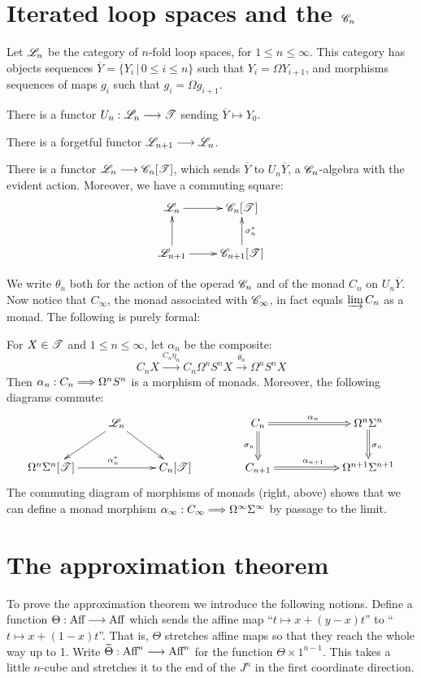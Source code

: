 \documentclass[11pt]{article}
\newcommand{\Aff}{\textup{Aff}}
\begin{document}
\begin{chapter4-6}
\section{Iterated loop spaces and the \texorpdfstring{$\mathscr{C}_n$}{Cn}}
Let $\mathscr{L}_n$ be the category of $n$-fold loop spaces, for $1\leq n\leq\infty$. This category has objects sequences $\overline{Y}=\{Y_i\,|\,0\leq i\leq n\}$ such that $Y_i=\Omega Y_{i+1}$, and morphisms sequences of maps $g_i$ such that $g_i=\Omega g_{i+1}$.
\begin{itemise}
\item There is a functor $U_n:\mathscr{L}_n\longrightarrow\mathscr{T}$ sending $\overline{Y}\mapsto Y_0$.
\item  There is a forgetful functor $\mathscr{L}_{n+1}\longrightarrow\mathscr{L}_{n}$.
\end{itemise}
\begin{thm*}[5.1]
There is a functor $\mathscr{L}_n\longrightarrow\mathscr{C}_n[\mathscr{T}]$, which sends $\overline{Y}$ to $U_n\overline{Y}$, a $\mathscr{C}_n$-algebra with the evident action. Moreover, we have a commuting square:
\[\xymatrix{
\scrL_n\ar[r]\ar[d];[]&\scrC_n[\scrT]\ar[d];[]_{\sigma_n^*}\\
\scrL_{n+1}\ar[r]&\scrC_{n+1}[\scrT]
}\]
\end{thm*}
We write $\theta_n$ both for the action of the operad $\mathscr{C}_n$ and of the monad $C_n$ on $U_n\overline{Y}$. Now notice that $C_\infty$, the monad associated with $\mathscr{C}_\infty$, in fact equals $\varinjlim C_n$ as a monad. The following is purely formal:
\begin{thm*}[5.2]
For $X\in\mathscr{T}$ and $1\leq n\leq\infty$, let $\alpha_n$ be the composite:
\[C_nX\overset{C_n\eta_n}{\to}C_n\Omega^nS^nX\overset{\theta_n}{\to}\Omega^nS^nX\]
Then $\alpha_n:C_n\Longrightarrow \Omega^n S^n$ is a morphism of monads. Moreover, the following diagrams commute:
\[\xymatrix{
&\scrL_n\ar[ld]\ar[rd]\\
\Omega^n\Sigma^n[\scrT]\ar[rr]^{\alpha_n^*}&&C_n[\scrT]
}\qquad\qquad\xymatrix@C=2cm{
C_n\ar@{=>}[d]_{\sigma_n}\ar@{=>}[r]^{\alpha_n}&\Omega^{n}\Sigma^{n}\ar@{=>}[d]^{\sigma_n}\\
C_{n+1}\ar@{=>}[r]^{\alpha_{n+1}}&\Omega^{n+1}\Sigma^{n+1}
}\]
The commuting diagram of morphisms of monads (right, above) shows that we can define a monad morphism $\alpha_\infty:C_\infty\Longrightarrow \Omega^\infty\Sigma^\infty$ by passage to the limit.
\end{thm*}
\section{The approximation theorem}
To prove the approximation theorem we introduce the following notions. Define a function $\Theta:\Aff\to\Aff$ which sends the affine map ``$t\mapsto x+(y-x)t$'' to 
``$t\mapsto x+(1-x)t$''. That is, $\Theta$ stretches affine maps so that they reach the whole way up to 1. Write $\widetilde{\Theta}:\Aff^n\to\Aff^n$ for the function $\Theta\times1^{n-1}$. This takes a little $n$-cube and stretches it to the end of the $J^n$ in the first coordinate direction.


\end{chapter4-6}
\end{document}
